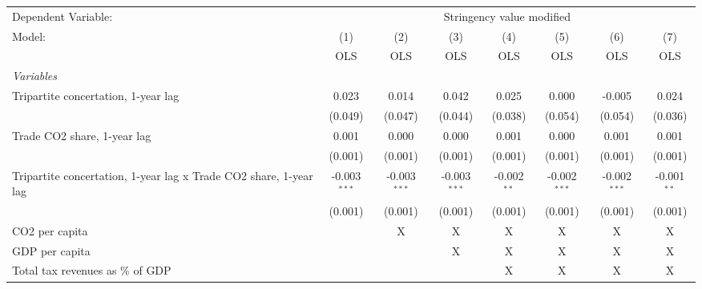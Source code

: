 
\begingroup
\centering
\begin{tabular}{lccccccc}
   \toprule
   Dependent Variable: & \multicolumn{7}{c}{Stringency value modified}\\
   Model:                                                            & (1)            & (2)            & (3)            & (4)           & (5)            & (6)            & (7)\\  
                                                                     &  OLS           & OLS            & OLS            & OLS           & OLS            & OLS            & OLS\\  
   \midrule
   \emph{Variables}\\
   Tripartite concertation, 1-year lag                               & 0.023          & 0.014          & 0.042          & 0.025         & 0.000          & -0.005         & 0.024\\   
                                                                     & (0.049)        & (0.047)        & (0.044)        & (0.038)       & (0.054)        & (0.054)        & (0.036)\\   
   Trade CO2 share, 1-year lag                                       & 0.001          & 0.000          & 0.000          & 0.001         & 0.000          & 0.001          & 0.001\\   
                                                                     & (0.001)        & (0.001)        & (0.001)        & (0.001)       & (0.001)        & (0.001)        & (0.001)\\   
   Tripartite concertation, 1-year lag x Trade CO2 share, 1-year lag & -0.003$^{***}$ & -0.003$^{***}$ & -0.003$^{***}$ & -0.002$^{**}$ & -0.002$^{***}$ & -0.002$^{***}$ & -0.001$^{**}$\\   
                                                                     & (0.001)        & (0.001)        & (0.001)        & (0.001)       & (0.001)        & (0.001)        & (0.001)\\   
   CO2 per capita                                                    &                & X              & X              & X             & X              & X              & X\\  
   GDP per capita                                                    &                &                & X              & X             & X              & X              & X\\  
   Total tax revenues as \% of GDP                                   &                &                &                & X             & X              & X              & X\\  

\end{tabular}
